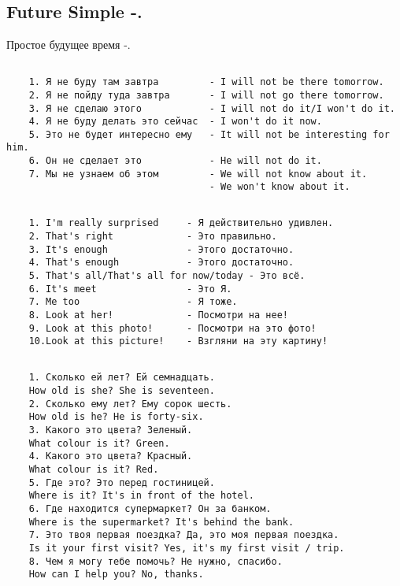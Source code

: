 \subsection{Future Simple -.}
Простое будущее время -.
\subsection*{}
\begin{verbatim}
    1. Я не буду там завтра         - I will not be there tomorrow.
    2. Я не пойду туда завтра       - I will not go there tomorrow.
    3. Я не сделаю этого            - I will not do it/I won't do it.
    4. Я не буду делать это сейчас  - I won't do it now.
    5. Это не будет интересно ему   - It will not be interesting for him.
    6. Он не сделает это            - He will not do it.
    7. Мы не узнаем об этом         - We will not know about it.
                                    - We won't know about it.
\end{verbatim}

\subsection*{}
\begin{verbatim}
    1. I'm really surprised     - Я действительно удивлен.
    2. That's right             - Это правильно.
    3. It's enough              - Этого достаточно.
    4. That's enough            - Этого достаточно.
    5. That's all/That's all for now/today - Это всё.
    6. It's meet                - Это Я.
    7. Me too                   - Я тоже.
    8. Look at her!             - Посмотри на нее!
    9. Look at this photo!      - Посмотри на это фото!
    10.Look at this picture!    - Взгляни на эту картину!
\end{verbatim}

\subsection*{}
\begin{verbatim}
    1. Сколько ей лет? Ей семнадцать.
    How old is she? She is seventeen.
    2. Сколько ему лет? Ему сорок шесть.
    How old is he? He is forty-six.
    3. Какого это цвета? Зеленый.
    What colour is it? Green.
    4. Какого это цвета? Красный.
    What colour is it? Red.
    5. Где это? Это перед гостиницей.
    Where is it? It's in front of the hotel.
    6. Где находится супермаркет? Он за банком.
    Where is the supermarket? It's behind the bank.
    7. Это твоя первая поездка? Да, это моя первая поездка.
    Is it your first visit? Yes, it's my first visit / trip.
    8. Чем я могу тебе помочь? Не нужно, спасибо.
    How can I help you? No, thanks.
\end{verbatim}

